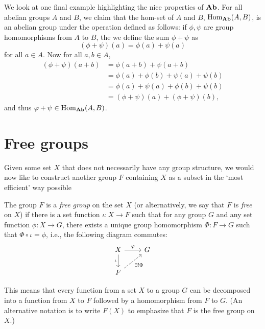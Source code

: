 We look at one final example highlighting the nice properties of \(\mathbf{Ab}\). For
all abelian groups \(A\) and \(B\), we claim that the hom-set of \(A\) and
\(B\), \(\operatorname{Hom}_{\mathbf{Ab}}(A, B)\), is an abelian group under the operation defined as
follows: if \(\phi, \psi\) are group homomorphisms from \(A\) to \(B\), the we
define the sum \(\phi + \psi\) as
\[
    (\phi + \psi)(a) = \phi(a) + \psi(a)
\]
for all \(a \in A\). Now for all \(a, b \in A\),
\begin{align*}
    (\phi + \psi)(a + b) &= \phi(a + b) + \psi(a + b)\\
    &= \phi(a) + \phi(b) + \psi(a) + \psi(b)\\
    &= \phi(a) + \psi(a) + \phi(b) + \psi(b)\\
    &= (\phi + \psi)(a) + (\phi + \psi)(b),
\end{align*}
and thus \(\varphi + \psi \in \operatorname{Hom}_{\mathbf{Ab}}(A, B)\).

\section{Free groups}
\label{sec:free-groups}

Given some set \(X\) that does not necessarily have any group structure, we
would now like to construct another group \(F\) containing \(X\) as a subset in
the `most efficient' way possible

\begin{definition}
    \label{def:free-group}
    The group \(F\) is a \emph{free group} on the set \(X\) (or alternatively,
    we say that \(F\) is \emph{free} on \(X\)) if there is a set function
    \(\iota: X \to F\) such that for any group \(G\) and any set function
    \(\phi: X \to G\), there exists a unique group homomorphism \(\Phi: F \to
    G\) such that \(\Phi \circ \iota = \phi\), i.e., the following diagram
    commutes:
    \[
        \begin{tikzcd}
            X \arrow[d, "\iota"'] \arrow[r, "\phi"] & G \\
            F \arrow[ru, "\exists!\Phi"', dashed]        &  
        \end{tikzcd}
    \]
\end{definition}

This means that every function from a set \(X\) to a group \(G\) can be
decomposed into a function from \(X\) to \(F\) followed by a homomorphism from
\(F\) to \(G\). (An alternative notation is to write \(F(X)\) to emphasize that
\(F\) is the free group on \(X\).)

